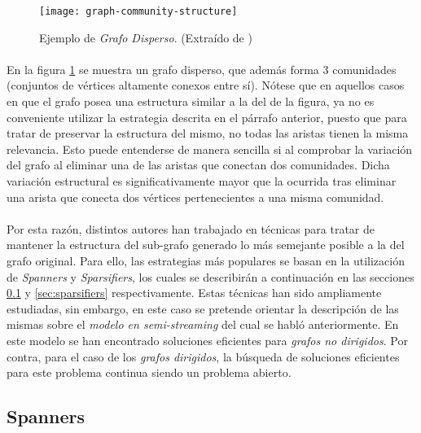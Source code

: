 \documentclass{subfiles}
\begin{document}
      \begin{figure}
        \centering
        \texttt{[image: graph-community-structure]}
        \caption{Ejemplo de \emph{Grafo Disperso}. (Extraído de \cite{wiki:Community_structure})}
        \label{img:graph_community_structure}
      \end{figure}

      \paragraph{}
      En la figura \ref{img:graph_community_structure} se muestra un grafo disperso, que además forma 3 comunidades (conjuntos de vértices altamente conexos entre sí). Nótese que en aquellos casos en que el grafo posea una estructura similar a la del de la figura, ya no es conveniente utilizar la estrategia descrita en el párrafo anterior, puesto que para tratar de preservar la estructura del mismo, no todas las aristas tienen la misma relevancia. Esto puede entenderse de manera sencilla si al comprobar la variación del grafo al eliminar una de las aristas que conectan dos comunidades. Dicha variación estructural es significativamente mayor que la ocurrida tras eliminar una arista que conecta dos vértices pertenecientes a una misma comunidad.

      \paragraph{}
      Por esta razón, distintos autores han trabajado en técnicas para tratar de mantener la estructura del sub-grafo generado lo más semejante posible a la del grafo original. Para ello, las estrategias más populares se basan en la utilización de \emph{Spanners} y \emph{Sparsifiers}, los cuales se describirán a continuación en las secciones \ref{sec:spanners} y \ref{sec:sparsifiers} respectivamente. Estas técnicas han sido ampliamente estudiadas, sin embargo, en este caso se pretende orientar la descripción de las mismas sobre el \emph{modelo en semi-streaming} del cual se habló anteriormente. En este modelo se han encontrado soluciones eficientes para \emph{grafos no dirigidos}. Por contra, para el caso de los \emph{grafos dirigidos}, la búsqueda de soluciones eficientes para este problema continua siendo un problema abierto.

      \subsection{Spanners}
      \label{sec:spanners}
\end{document}
